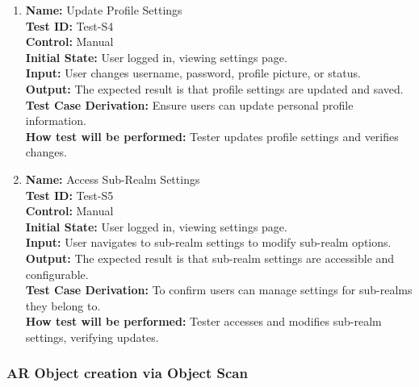 \documentclass[12pt, titlepage]{article}
\begin{document}
\begin{enumerate}
    \item \textbf{Name:} {Update Profile Settings} \label{itm:Test-S4}\\
    \textbf{Test ID:} Test-S4\\
    \textbf{Control:} Manual \\
    \textbf{Initial State:} User logged in, viewing settings page. \\
    \textbf{Input:} User changes username, password, profile picture, or status. \\
    \textbf{Output:} The expected result is that profile settings are updated and saved. \\
    \textbf{Test Case Derivation:} Ensure users can update personal profile information. \\
    \textbf{How test will be performed:} Tester updates profile settings and verifies changes.

    \item \textbf{Name:} {Access Sub-Realm Settings} \label{itm:Test-S5}\\
    \textbf{Test ID:} Test-S5\\
    \textbf{Control:} Manual \\
    \textbf{Initial State:} User logged in, viewing settings page. \\
    \textbf{Input:} User navigates to sub-realm settings to modify sub-realm options. \\
    \textbf{Output:} The expected result is that sub-realm settings are accessible and configurable. \\
    \textbf{Test Case Derivation:} To confirm users can manage settings for sub-realms they belong to. \\
    \textbf{How test will be performed:} Tester accesses and modifies sub-realm settings, verifying updates.

\end{enumerate}

\subsubsection{AR Object creation via Object Scan}
\end{document}
